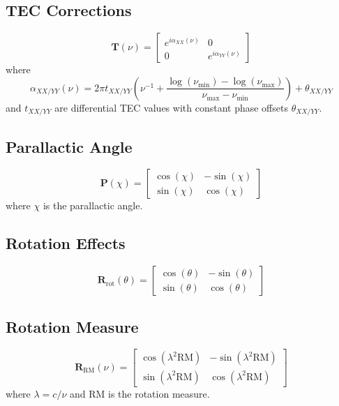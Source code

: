 \documentclass{aastex631}
\begin{document}
\subsection{TEC Corrections}
\begin{equation}
\mathbf{T}(\nu) = \begin{bmatrix} 
e^{i \alpha_{XX}(\nu)} & 0 \\ 
0 & e^{i \alpha_{YY}(\nu)} 
\end{bmatrix}
\end{equation}
where
\begin{equation}
\alpha_{XX/YY}(\nu) = 2\pi t_{XX/YY}\left(\nu^{-1} + \frac{\log(\nu_{\min}) - \log(\nu_{\max})}{\nu_{\max} - \nu_{\min}}\right) + \theta_{XX/YY}
\end{equation}
and $t_{XX/YY}$ are differential TEC values with constant phase offsets $\theta_{XX/YY}$.

\subsection{Parallactic Angle}
\begin{equation}
\mathbf{P}(\chi) = \begin{bmatrix} 
\cos(\chi) & -\sin(\chi) \\ 
\sin(\chi) & \cos(\chi) 
\end{bmatrix}
\end{equation}
where $\chi$ is the parallactic angle.

\subsection{Rotation Effects}
\begin{equation}
\mathbf{R}_{\mathrm{rot}}(\theta) = \begin{bmatrix} 
\cos(\theta) & -\sin(\theta) \\ 
\sin(\theta) & \cos(\theta) 
\end{bmatrix}
\end{equation}

\subsection{Rotation Measure}
\begin{equation}
\mathbf{R}_{\mathrm{RM}}(\nu) = \begin{bmatrix} 
\cos(\lambda^2 \mathrm{RM}) & -\sin(\lambda^2 \mathrm{RM}) \\ 
\sin(\lambda^2 \mathrm{RM}) & \cos(\lambda^2 \mathrm{RM}) 
\end{bmatrix}
\end{equation}
where $\lambda = c/\nu$ and RM is the rotation measure.
\end{document}
